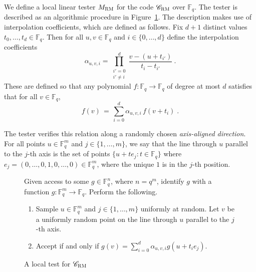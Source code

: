 \documentclass[11pt]{article}
\theoremstyle{definition}
\newcommand{\code}{\mathscr{C}}
\newcommand{\F}{\ensuremath{\mathbb{F}}}
\newcommand{\RM}{\ensuremath{\textsc{RM}}}
\newenvironment{gamespec}{
  \begin{mdframed}[style=figstyle]}{
  \end{mdframed}}
\begin{document}
We define a local linear tester $M_{\RM}$ for the code $\code_\RM$ over $\F_q$. The tester is described as an algorithmic procedure in Figure~\ref{fig:RM-tester}. %
The description makes use of interpolation coefficients, which are defined as follows. %
Fix $d+1$ distinct values $t_0,\ldots,t_d \in \F_q$. Then for all $u,v \in \F_q$ and $i \in \{0,\ldots,d\}$ define the interpolation coefficients
 \begin{equation}\label{eq:interp-coeff}
 \alpha_{u,v,i} = \prod_{\substack{i'=0\\i'\neq i}}^{d}  \frac{v - (u + t_{i'})}{t_i - t_{i'}}~.
 \end{equation}
These are defined so that any polynomial $f:\F_q\to\F_q$ of degree at most $d$ satisfies
that for all $v \in \F_q$, 
\[ f(v)\,=\, \sum_{i=0}^{d} \alpha_{u,v,i} \, f(v+t_i)\;.\]

The tester verifies this relation along a randomly chosen \emph{axis-aligned direction}.  For all points $u \in \F_q^m$ and $j \in \{1,\ldots,m\}$, we say that the line through $u$ parallel to the $j$-th axis is the set of points $\{ u + te_j : t \in \F_q \}$ where $e_j=(0,\ldots,0,1,0,\ldots,0)\in \F_q^m$, where the unique $1$ is in the $j$-th position. 


\begin{figure}[!htbp]
  \centering
  \begin{gamespec}
Given access to some $g\in \F_q^n$, where $n=q^m$, identify $g$ with a function $g:\F_q^m\to \F_q$. Perform the following.
\begin{enumerate}
	\item Sample	$u\in \F_q^m$ and $j\in \{1,\ldots,m\}$ uniformly at random. Let $v$ be a uniformly random point on the line through $u$ parallel to the $j$-th axis.
	\item 
	Accept if and only if $g(v) = \sum_{i=0}^{d} \alpha_{u,v,i} g(u+t_i e_j)$. 
    \end{enumerate}
  \end{gamespec}
  \caption{A local test for $\code_{\RM}$}
  \label{fig:RM-tester}
\end{figure}
\end{document}
